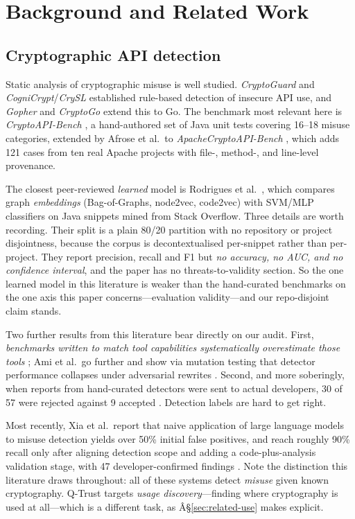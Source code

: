 \documentclass[conference]{IEEEtran}
\begin{document}
\section{Background and Related Work}

\subsection{Cryptographic API detection}

Static analysis of cryptographic misuse is well studied. \emph{CryptoGuard}
\cite{cryptoguard} and \emph{CogniCrypt}/\emph{CrySL} \cite{cognicrypt, crysl} established
rule-based detection of insecure API use, and \emph{Gopher} \cite{gopher} and
\emph{CryptoGo} extend this to Go. The benchmark most relevant here is
\emph{CryptoAPI-Bench} \cite{cryptoapibench}, a hand-authored set of Java unit tests
covering 16--18 misuse categories, extended by Afrose et al.\ to \emph{ApacheCryptoAPI-Bench}
\cite{afrose2023}, which adds 121 cases from ten real Apache projects with file-, method-,
and line-level provenance.

The closest peer-reviewed \emph{learned} model is Rodrigues et al.\ \cite{rodrigues2023},
which compares graph \emph{embeddings} (Bag-of-Graphs, node2vec, code2vec) with SVM/MLP
classifiers on Java snippets mined from Stack Overflow. Three details are worth recording.
Their split is a plain 80/20 partition with no repository or project disjointness, because
the corpus is decontextualised per-snippet rather than per-project. They report precision,
recall and F1 but \emph{no accuracy, no AUC, and no confidence interval}, and the paper has
no threats-to-validity section. So the one learned model in this literature is weaker than
the hand-curated benchmarks on the one axis this paper concerns---evaluation validity---and
our repo-disjoint claim stands.

Two further results from this literature bear directly on our audit. First, \emph{benchmarks
written to match tool capabilities systematically overestimate those tools}
\cite{ami2022}; Ami et al.\ go further and show via mutation testing that detector
performance collapses under adversarial rewrites \cite{ami2026}. Second, and more
soberingly, when reports from hand-curated detectors were sent to actual developers,
30 of 57 were rejected against 9 accepted \cite{zhang2023}. Detection labels are hard
to get right.

Most recently, Xia et al.\ report that naive application of large language models to
misuse detection yields over 50\% initial false positives, and reach roughly 90\%
recall only after aligning detection scope and adding a code-plus-analysis validation
stage, with 47 developer-confirmed findings \cite{xia2025}. Note the distinction this
literature draws throughout: all of these systems detect \emph{misuse} given known
cryptography. Q-Trust targets \emph{usage discovery}---finding where cryptography is used
at all---which is a different task, as Â§\ref{sec:related-use} makes explicit.
\end{document}
